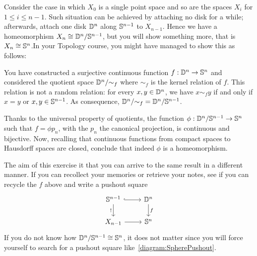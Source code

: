 \begin{exercise} Consider the case in which
  \(X_0\) is a single point space and so are the spaces \(X_i\) for
  \(1 \le i \le n-1\). Such situation can be achieved by attaching no
  disk for a while; afterwards, attach one disk \(\mathbb D^{n}\) along
  \(\mathbb S^{n-1}\) to \(X_{n-1}\). Hence we have a homeomorphism
  \(X_n \cong {\mathbb D^n}{/}{\mathbb S^{n-1}}\), but you will show something
  more, that is \(X_n \cong \mathbb S^n\).\newline In your Topology course,
  you might have managed to show this as follows:
  \begin{tcbenum}
  \item You have constructed a surjective continuous function
    \(f : \mathbb D^n \to \mathbb S^n\) and considered the quotient space
    \({\mathbb D^n}{/}{\sim_f}\) where \(\sim_f\) is the kernel relation
     of \(f\). This relation
    is not a random relation: for every \(x, y \in \mathbb D^n\), we have
    \(x \sim_f y\) if and only if \(x = y\) or \(x, y \in
    \mathbb S^{n-1}\). As consequence,
    \({\mathbb D^n}{/}{\sim_f} = {\mathbb D^n}{/}{\mathbb S^{n-1}}\).
  \item Thanks to the universal property of quotients, the function
    \(\phi : {\mathbb D^n}{/}{\mathbb S^{n-1}} \to \mathbb S^n\) such that
    \(f = \phi p_n\), with the \(p_n\) the canonical projection, is
    continuous and bijective. Now, recalling that continuous functions
    from compact spaces to Hausdorff spaces are closed, conclude that
    indeed \(\phi\) is a homeomorphism.
  \end{tcbenum}
  The aim of this exercise it that you can arrive to the same result in
  a different manner. If you can recollect your memories or retrieve
  your notes, see if you can recycle the \(f\) above and write a pushout
  square
  \begin{equation}\begin{tikzcd}
      \sph^{n-1} \ar[hookrightarrow, r] \ar["!", d, swap] & \dsc^n \ar["f", d] \\
      X_{n-1} \ar[r] & \sph^n
    \end{tikzcd}\label{diagram:SpherePushout}\end{equation}
  If you do not know how \({\mathbb D^n}{/}{\mathbb S^{n-1}} \cong \mathbb S^n\), it
  does not matter since you will force yourself to search for a pushout
  square like~\eqref{diagram:SpherePushout}.
\end{exercise}

